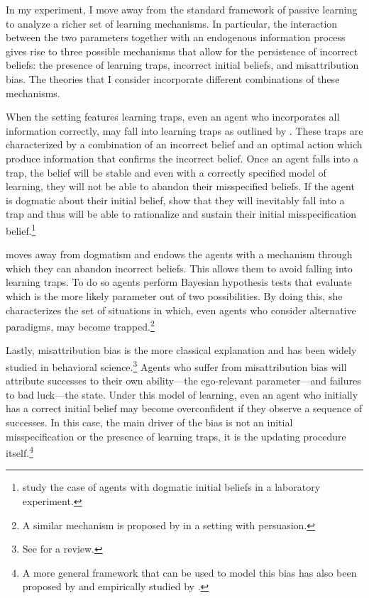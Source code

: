 \documentclass[
  12pt,
]{article}
\begin{document}
In my experiment, I move away from the standard framework of passive
learning to analyze a richer set of learning mechanisms. In particular,
the interaction between the two parameters together with an endogenous
information process gives rise to three possible mechanisms that allow
for the persistence of incorrect beliefs: the presence of learning
traps, incorrect initial beliefs, and misattribution bias. The theories
that I consider incorporate different combinations of these mechanisms.

When the setting features learning traps, even an agent who incorporates
all information correctly, may fall into learning traps as outlined by
\citet{Hestermann2021}. These traps are characterized by a combination
of an incorrect belief and an optimal action which produce information
that confirms the incorrect belief. Once an agent falls into a trap, the
belief will be stable and even with a correctly specified model of
learning, they will not be able to abandon their misspecified beliefs.
If the agent is dogmatic about their initial belief,
\citet{Heidhues2018} show that they will inevitably fall into a trap and
thus will be able to rationalize and sustain their initial
misspecification
belief.\footnote{\citet{Gotte2022} study the case of agents with dogmatic initial beliefs in a 
laboratory experiment.}

\citet{Ba2023} moves away from dogmatism and endows the agents with a
mechanism through which they can abandon incorrect beliefs. This allows
them to avoid falling into learning traps. To do so agents perform
Bayesian hypothesis tests that evaluate which is the more likely
parameter out of two possibilities. By doing this, she characterizes the
set of situations in which, even agents who consider alternative
paradigms, may become trapped.\footnote{A 
similar mechanism is proposed by \citet{Schwarstein2021} in a setting with persuasion.}

Lastly, misattribution bias is the more classical explanation and has
been widely studied in behavioral
science.\footnote{See \citet{kelley1980} for a review.} Agents who
suffer from misattribution bias will attribute successes to their own
ability---the ego-relevant parameter---and failures to bad luck---the
state. Under this model of learning, even an agent who initially has a
correct initial belief may become overconfident if they observe a
sequence of successes. In this case, the main driver of the bias is not
an initial misspecification or the presence of learning traps, it is the
updating procedure
itself.\footnote{A more general framework that can be used to model 
this bias has also been proposed by \citet{Brunnermeier2005} and empirically studied by \citet{Bracha2012}.}
\end{document}

